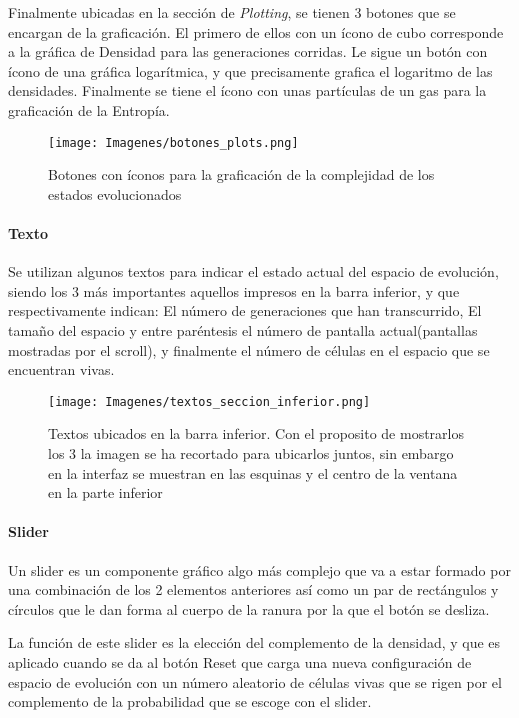 \documentclass[]{article}
\begin{document}
				\hfill \break
				\justifying
				Finalmente ubicadas en la sección de \textit{Plotting}, se tienen 3 botones que se encargan de la graficación.
				El primero de ellos con un ícono de cubo corresponde a la gráfica de Densidad para las generaciones corridas. Le sigue un botón con ícono de una gráfica logarítmica, y que precisamente grafica el logaritmo de las densidades. Finalmente se tiene el ícono con unas partículas de un gas para la graficación de la Entropía.
				
				\begin{figure}[!h]
					\centering
					\texttt{[image: Imagenes/botones\_plots.png]}
					\caption{Botones con íconos para la graficación de la complejidad de los estados evolucionados}
					\label{Botones_graficacion}
				\end{figure}
				
				\paragraph{Texto}
				\justifying
				Se utilizan algunos textos para indicar el estado actual del espacio de evolución, siendo los 3 más importantes aquellos impresos en la barra inferior, y que respectivamente indican: El número de generaciones que han transcurrido, El tamaño del espacio y entre paréntesis el número de pantalla actual(pantallas mostradas por el scroll), y finalmente el número de células en el espacio que se encuentran vivas.
				
				\begin{figure}[!h]
					\centering
					\texttt{[image: Imagenes/textos\_seccion\_inferior.png]}
					\caption{Textos ubicados en la barra inferior. Con el proposito de mostrarlos los 3 la imagen se ha recortado para ubicarlos juntos, sin embargo en la interfaz se muestran en las esquinas y el centro de la ventana en la parte inferior}
				\end{figure}
				
				\paragraph{Slider}
				\justifying
				Un slider es un componente gráfico algo más complejo que va a estar formado por una combinación de los 2 elementos anteriores así como un par de rectángulos y círculos que le dan forma al cuerpo de la ranura por la que el botón se desliza.
				
				\hfill\break
				\justifying
				La función de este slider es la elección del complemento de la densidad, y que es aplicado cuando se da al botón Reset que carga una nueva configuración de espacio de evolución con un número aleatorio de células vivas que se rigen por el complemento de la probabilidad que se escoge con el slider.
				
\end{document}
